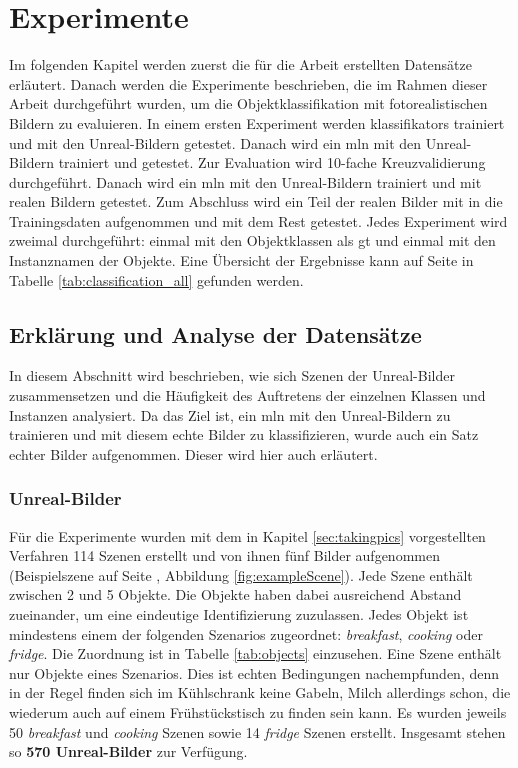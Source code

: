 \graphicspath{{./images/}}      
\def\CHAPTERONE{./chapters/Chapter-1} 

\chapter{Experimente}
\label{chap:experiments}
%	

Im folgenden Kapitel werden zuerst die für die Arbeit erstellten Datensätze erläutert. Danach werden die Experimente beschrieben, die im Rahmen dieser Arbeit durchgeführt wurden, um die Objektklassifikation mit fotorealistischen Bildern zu evaluieren. \newline
In einem ersten Experiment werden \glspl{klassifikator} trainiert und mit den Unreal-Bildern getestet. Danach wird ein \gls{mln} mit den Unreal-Bildern trainiert und getestet. Zur Evaluation wird 10-fache Kreuzvalidierung durchgeführt. Danach wird ein \gls{mln} mit den Unreal-Bildern trainiert und mit realen Bildern getestet. Zum Abschluss wird ein Teil der realen Bilder mit in die Trainingsdaten aufgenommen und mit dem Rest getestet. Jedes Experiment wird zweimal durchgeführt: einmal mit den Objektklassen als \gls{gt} und einmal mit den Instanznamen der Objekte. Eine Übersicht  der Ergebnisse kann auf Seite \pageref{tab:classification_all} in Tabelle \ref{tab:classification_all} gefunden werden.

\section{Erklärung und Analyse der Datensätze}

In diesem Abschnitt wird beschrieben, wie sich Szenen der Unreal-Bilder zusammensetzen und die Häufigkeit des Auftretens der einzelnen Klassen und Instanzen analysiert. Da das Ziel ist, ein \gls{mln} mit den Unreal-Bildern zu trainieren und mit diesem echte Bilder zu klassifizieren, wurde auch ein Satz echter Bilder aufgenommen. Dieser wird hier auch erläutert.

\subsection{Unreal-Bilder}  
Für die Experimente wurden mit dem in Kapitel \ref{sec:takingpics} vorgestellten Verfahren 114 Szenen erstellt und von ihnen fünf Bilder aufgenommen (Beispielszene auf Seite \pageref{fig:exampleScene}, Abbildung \ref{fig:exampleScene}). Jede Szene enthält zwischen 2 und 5 Objekte. Die Objekte haben dabei ausreichend Abstand zueinander, um eine eindeutige Identifizierung zuzulassen. Jedes Objekt ist mindestens einem der folgenden Szenarios zugeordnet: \textit{breakfast}, \textit{cooking} oder \textit{fridge}. Die Zuordnung ist in Tabelle \ref{tab:objects} einzusehen. Eine Szene enthält nur Objekte eines Szenarios. Dies ist echten Bedingungen nachempfunden, denn in der Regel finden sich im Kühlschrank keine Gabeln, Milch allerdings schon, die wiederum auch auf einem Frühstückstisch zu finden sein kann. Es wurden jeweils 50 \textit{breakfast} und \textit{cooking} Szenen sowie 14 \textit{fridge} Szenen erstellt. Insgesamt stehen so \textbf{570 Unreal-Bilder} zur Verfügung. \par

